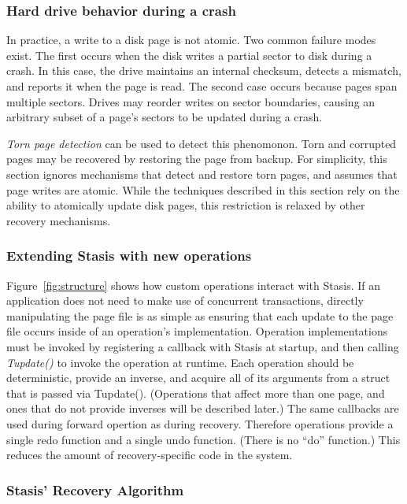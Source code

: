 \documentclass[letterpaper,twocolumn,10pt]{article}
\newcommand{\yad}{Stasis\xspace}
\newcommand{\yads}{Stasis'\xspace}
\begin{document}
\subsubsection{Hard drive behavior during a crash}
In practice, a write to a disk page is not atomic.  Two common failure
modes exist.  The first occurs when the disk writes a partial sector
to disk during a crash.  In this case, the drive maintains an internal
checksum, detects a mismatch, and reports it when the page is read.
The second case occurs because pages span multiple sectors.  Drives
may reorder writes on sector boundaries, causing an arbitrary subset
of a page's sectors to be updated during a crash.  

{\em Torn page detection} can be used to detect this phenomonon.  Torn
and corrupted pages may be recovered by restoring the page from
backup.  For simplicity, this section ignores mechanisms that detect
and restore torn pages, and assumes that page writes are atomic.
While the techniques described in this section rely on the ability to
atomically update disk pages, this restriction is relaxed by other 
recovery mechanisms.


\subsubsection{Extending \yad with new operations}

Figure~\ref{fig:structure} shows how custom operations interact with
\yad.  If an application does not need to make use of concurrent
transactions, directly manipulating the page file is as simple as
ensuring that each update to the page file occurs inside of an
operation's implementation.  Operation implementations must be invoked
by registering a callback with \yad at startup, and then calling {\em
Tupdate()} to invoke the operation at runtime.  Each operation should
be deterministic, provide an inverse, and acquire all of its arguments
from a struct that is passed via Tupdate().  (Operations that affect
more than one page, and ones that do not provide inverses will be
described later.)  The same callbacks are used during forward opertion
as during recovery.  Therefore operations provide a single redo
function and a single undo function.  (There is no ``do''
function.)  This reduces the amount of recovery-specific code in the
system.

\subsubsection{\yads Recovery Algorithm}
\end{document}
